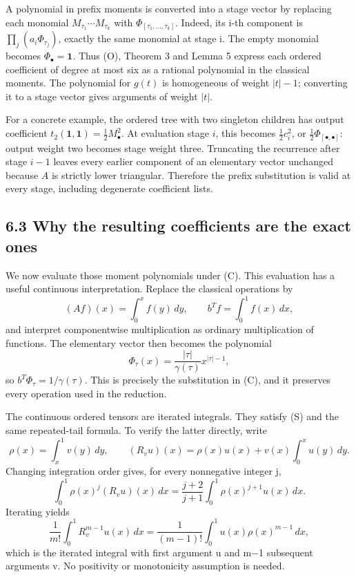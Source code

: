 \documentclass[
  11pt,
  a4paper,
]{scrartcl}
\begin{document}
A polynomial in prefix moments is converted into a stage vector by
replacing each monomial \(M_{\tau_1}\cdots M_{\tau_k}\) with
\(\Phi_{[\tau_1,\ldots,\tau_k]}\). Indeed, its i-th component is
\(\prod_j(a_i\Phi_{\tau_j})\), exactly the same monomial at stage i. The
empty monomial becomes \(\Phi_\bullet=\mathbf1\). Thus (O), Theorem 3
and Lemma 5 express each ordered coefficient of degree at most six as a
rational polynomial in the classical moments. The polynomial for
\(g(t)\) is homogeneous of weight \(|t|-1\); converting it to a stage
vector gives arguments of weight \(|t|\).

For a concrete example, the ordered tree with two singleton children has
output coefficient \(t_2(\mathbf1,\mathbf1)=\tfrac12M_\bullet^2\). At
evaluation stage \(i\), this becomes \(\tfrac12c_i^2\), or
\(\tfrac12\Phi_{[\bullet,\bullet]}\): output weight two becomes stage
weight three. Truncating the recurrence after stage \(i-1\) leaves every
earlier component of an elementary vector unchanged because \(A\) is
strictly lower triangular. Therefore the prefix substitution is valid at
every stage, including degenerate coefficient lists.

\subsection{6.3 Why the resulting coefficients are the exact
ones}\label{why-the-resulting-coefficients-are-the-exact-ones}

We now evaluate those moment polynomials under (C). This evaluation has
a useful continuous interpretation. Replace the classical operations by
\[
(Af)(x)=\int_0^x f(y)\,dy,\qquad
b^Tf=\int_0^1f(x)\,dx,
\] and interpret componentwise multiplication as ordinary multiplication
of functions. The elementary vector then becomes the polynomial \[
\Phi_\tau(x)=\frac{|\tau|}{\gamma(\tau)}x^{|\tau|-1},
\] so \(b^T\Phi_\tau=1/\gamma(\tau)\). This is precisely the
substitution in (C), and it preserves every operation used in the
reduction.

The continuous ordered tensors are iterated integrals. They satisfy (S)
and the same repeated-tail formula. To verify the latter directly, write
\[
\rho(x)=\int_x^1v(y)\,dy,
\qquad (R_vu)(x)=\rho(x)u(x)+v(x)\int_0^xu(y)\,dy.
\] Changing integration order gives, for every nonnegative integer j, \[
\int_0^1\rho(x)^j(R_vu)(x)\,dx
=\frac{j+2}{j+1}\int_0^1\rho(x)^{j+1}u(x)\,dx.
\] Iterating yields \[
\frac1{m!}\int_0^1R_v^{m-1}u(x)\,dx
=\frac1{(m-1)!}\int_0^1u(x)\rho(x)^{m-1}\,dx,
\] which is the iterated integral with first argument u and m−1
subsequent arguments v. No positivity or monotonicity assumption is
needed.
\end{document}
